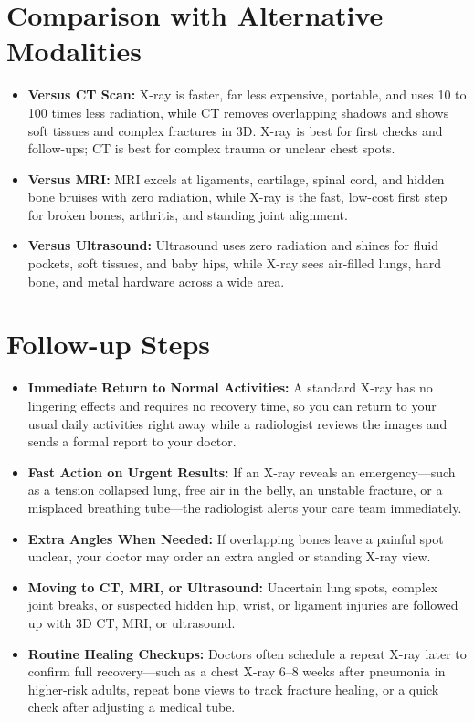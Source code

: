 \section{Comparison with Alternative Modalities}

\begin{itemize}
    \item \textbf{Versus CT Scan:} X-ray is faster, far less expensive, portable, and uses 10 to 100 times less radiation, while CT removes overlapping shadows and shows soft tissues and complex fractures in 3D. X-ray is best for first checks and follow-ups; CT is best for complex trauma or unclear chest spots.
    \item \textbf{Versus MRI:} MRI excels at ligaments, cartilage, spinal cord, and hidden bone bruises with zero radiation, while X-ray is the fast, low-cost first step for broken bones, arthritis, and standing joint alignment.
    \item \textbf{Versus Ultrasound:} Ultrasound uses zero radiation and shines for fluid pockets, soft tissues, and baby hips, while X-ray sees air-filled lungs, hard bone, and metal hardware across a wide area.
\end{itemize}

\section{Follow-up Steps}

\begin{itemize}
    \item \textbf{Immediate Return to Normal Activities:} A standard X-ray has no lingering effects and requires no recovery time, so you can return to your usual daily activities right away while a radiologist reviews the images and sends a formal report to your doctor.
    \item \textbf{Fast Action on Urgent Results:} If an X-ray reveals an emergency---such as a tension collapsed lung, free air in the belly, an unstable fracture, or a misplaced breathing tube---the radiologist alerts your care team immediately.
    \item \textbf{Extra Angles When Needed:} If overlapping bones leave a painful spot unclear, your doctor may order an extra angled or standing X-ray view.
    \item \textbf{Moving to CT, MRI, or Ultrasound:} Uncertain lung spots, complex joint breaks, or suspected hidden hip, wrist, or ligament injuries are followed up with 3D CT, MRI, or ultrasound.
    \item \textbf{Routine Healing Checkups:} Doctors often schedule a repeat X-ray later to confirm full recovery---such as a chest X-ray 6--8 weeks after pneumonia in higher-risk adults, repeat bone views to track fracture healing, or a quick check after adjusting a medical tube.
\end{itemize}

